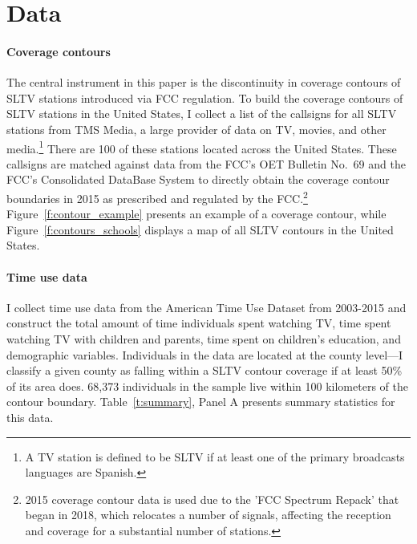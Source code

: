 \documentclass[11pt]{article}
\begin{document}
\section{Data}\label{s:data}



\paragraph{Coverage contours}  The central instrument in this paper is the discontinuity in coverage contours of SLTV stations introduced via FCC regulation. To build the coverage contours of SLTV stations in the United States, I collect a list of the callsigns for all SLTV stations from TMS Media, a large provider of data on TV, movies, and other media.\footnote{ A TV station is defined to be SLTV if at least one of the primary broadcasts languages are Spanish.} There are 100 of these stations located across the United States. These callsigns are matched against data from the FCC's OET Bulletin No.~69 and the FCC's Consolidated DataBase System to directly obtain the coverage contour boundaries in 2015 as prescribed and regulated by the FCC.\footnote{ 2015 coverage contour data is used due to the 'FCC Spectrum Repack' that began in 2018, which relocates a number of signals, affecting the reception and coverage for a substantial number of stations.}  %
Figure~\ref{f:contour_example} presents an example of a coverage contour, while Figure~\ref{f:contours_schools} displays a map of all SLTV contours in the United States.

\paragraph{Time use data} I collect time use data from the American Time Use Dataset from 2003-2015 and construct the total amount of time individuals spent watching TV, time spent watching TV with children and parents, time spent on children's education, and demographic variables. Individuals in the data are located at the county level---I classify a given county as falling within a SLTV contour coverage if at least 50\% of its area does. 68,373 individuals in the sample live within 100 kilometers of the contour boundary. Table~\ref{t:summary}, Panel A presents summary statistics for this data.  
	
\end{document}
